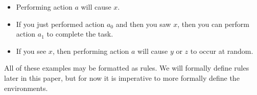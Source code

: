 \documentclass[letterpaper]{article} %
\begin{document}
\begin{itemize}
	\item Performing action $a$ will cause $x$.
	\item If you just performed action $a_0$ and then you saw $x$, then you can perform action $a_1$ to complete the task.
	\item If you see $x$, then performing action $a$ will cause $y$ or $z$ to occur at random.
\end{itemize}

All of these examples may be formatted as rules. We will formally
define rules later in this paper, but for now it is imperative to more
formally define the environments.









\end{document}
